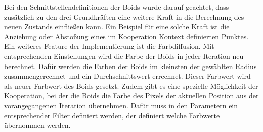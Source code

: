 \documentclass[../mciAusarbeitung.tex]{subfiles}
\begin{document}
	Bei den Schnittstellendefinitionen der Boids wurde darauf geachtet, dass zusätzlich zu den drei Grundkräften eine weitere Kraft in die Berechnung des neuen Zustands einfließen kann. Ein Beispiel für eine solche Kraft ist die Anziehung oder Abstoßung eines im Kooperation Kontext definierten Punktes.\\
	Ein weiteres Feature der Implementierung ist die Farbdiffusion. Mit entsprechenden Einstellungen wird die Farbe der Boids in jeder Iteration neu berechnet. Dafür werden die Farben der Boids im kleinsten der gewählten Radius zusammengerechnet und ein Durchschnittswert errechnet. Dieser Farbwert wird als neuer Farbwert des Boids gesetzt. Zudem gibt es eine spezielle Möglichkeit der Kooperation, bei der die Boids die Farbe des Pixels der aktuellen Position aus der vorangegangenen Iteration übernehmen. Dafür muss in den Parametern ein entsprechender Filter definiert werden, der definiert welche Farbwerte übernommen werden.
	
\end{document}
